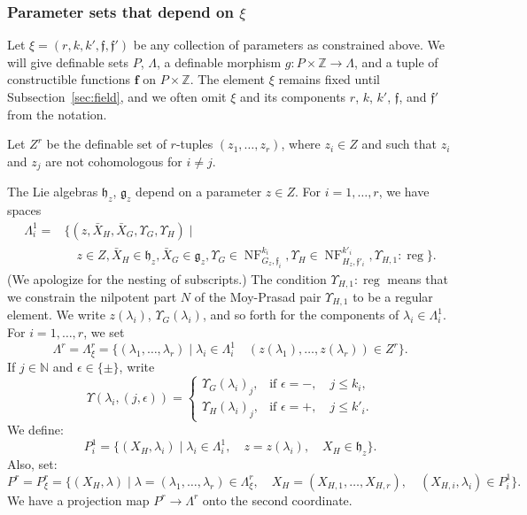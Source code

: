 \documentclass[12pt]{amsart}
\newcommand{\op}[1]{\operatorname{#1}}
\newcommand{\ring}[1]{{\mathbb #1}}
\def\NF{\op{NF}}
\def\Y{\Upsilon}
\def\s{{\mathfrak{f}}}
\def\bf{\mathbf f}
\newcommand{\cF}{\mathcal{F}}
\newcommand{\fg}{\mathfrak{g}}
\newcommand{\fh}{\mathfrak{h}}
\theoremstyle{plain}
\theoremstyle{definition}
\begin{document}

\subsubsection{Parameter sets that depend on $\xi$}

Let $\xi=(r,k,k',\s,\s')$ be any collection of parameters as
constrained above.  We will give definable sets $P$, $\Lambda$, a
definable morphism $g:P\times\ring{Z}\to \Lambda$, and a tuple of
constructible functions $\bf$ on $P\times\ring{Z}$.  The element $\xi$
remains fixed until Subsection~\ref{sec:field}, and we often omit
$\xi$ and its components $r$, $k$, $k'$, $\s$, and $\s'$ from the
notation.

Let $Z^r$ be the definable
set of $r$-tuples $(z_1,\ldots,z_r)$, where $z_i \in Z$ and such
that $z_i$ and $z_j$ are not cohomologous for $i\ne j$.  

The Lie algebras $\fh_z$, $\fg_z$ depend on a parameter $z\in Z$.
For $i=1,\ldots,r$, we have spaces
\begin{align*}
\Lambda^1_i = &\{(z,\bar X_H,\bar X_G,\Y_G,\Y_H) \mid \\
     &\quad z\in Z, 
\bar X_H \in \fh_z, \bar X_G\in \fg_z, 
\Y_G\in \NF^{k_i}_{G_z,\s_i}, \Y_H\in \NF^{k'_i}_{H_z,\s'_i}, \Y_{H,1}:\op{reg}\}.
\end{align*}
(We apologize for the nesting of subscripts.)  The condition
$\Y_{H,1}:\op{reg}$ means that we constrain the nilpotent part $N$ of
the Moy-Prasad pair $\Y_{H,1}$ to be a regular element.  We write
$z(\lambda_i)$, $\Y_G(\lambda_i)$, and so forth for the components of
$\lambda_i\in\Lambda^1_i$.  For $i=1,\ldots,r$, we set
\[
\Lambda^r = \Lambda^r_\xi = 
\{(\lambda_1,\ldots,\lambda_r) \mid \lambda_i \in \Lambda^1_i\quad
  (z(\lambda_1),\ldots,z(\lambda_r))\in Z^r \}.
\]
If $j\in\ring{N}$ and $\epsilon\in\{\pm\}$, write
\[
\Y(\lambda_i,(j,\epsilon)) = 
\begin{cases}
\Y_G(\lambda_i)_j,&\text{if }\epsilon= -,\quad j\le k_i,\\
\Y_H(\lambda_i)_j,&\text{if }\epsilon= +,\quad j\le k'_i.
\end{cases}
\]
We
define:
\[
P^1_i = \{(X_H,\lambda_i) \mid \lambda_i\in \Lambda^1_i,
\quad z = z(\lambda_i),\quad X_H \in \fh_z\}.
\]
Also, set:
\[
P^r = P^r_\xi = \{(X_H,\lambda) \mid \lambda = 
(\lambda_1,\ldots,\lambda_r)\in \Lambda^r_\xi,\quad
  X_H = (X_{H,1},\ldots,X_{H,r}), \quad (X_{H,i},\lambda_i) \in P^1_i\}.
\]
We have a projection map $P^r\to \Lambda^r$ onto the second coordinate.
\end{document}
